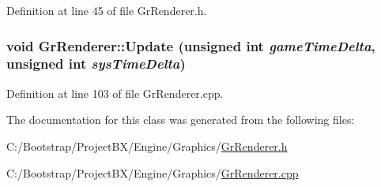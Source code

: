 Definition at line 45 of file GrRenderer.h.\hypertarget{class_gr_renderer_7fd1313c1e8a5a9899726a18bdcf8e81}{
\subsubsection[{Update}]{\setlength{\rightskip}{0pt plus 5cm}void GrRenderer::Update (unsigned int {\em gameTimeDelta}, \/  unsigned int {\em sysTimeDelta})}}
\label{class_gr_renderer_7fd1313c1e8a5a9899726a18bdcf8e81}




Definition at line 103 of file GrRenderer.cpp.

The documentation for this class was generated from the following files:\begin{CompactItemize}
\item 
C:/Bootstrap/ProjectBX/Engine/Graphics/\hyperlink{_gr_renderer_8h}{GrRenderer.h}\item 
C:/Bootstrap/ProjectBX/Engine/Graphics/\hyperlink{_gr_renderer_8cpp}{GrRenderer.cpp}\end{CompactItemize}
